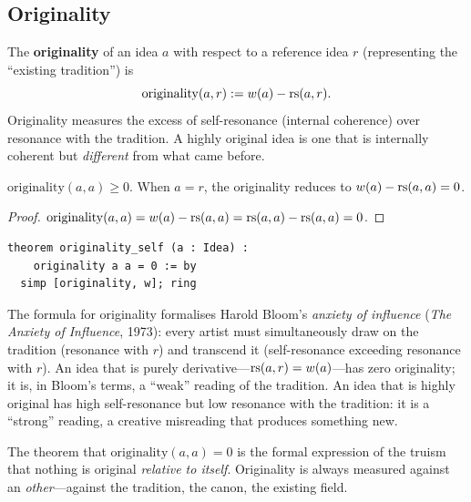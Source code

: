 \subsection{Originality}

\begin{definition}[Originality]
\label{def:originality}
The \textbf{originality} of an idea $a$ with respect to a reference idea
$r$ (representing the ``existing tradition'') is
\[
  \mathrm{originality}(a, r) := w(a) - \mathrm{rs}(a, r).
\]
Originality measures the excess of self-resonance (internal coherence) over
resonance with the tradition.  A highly original idea is one that is
internally coherent but \emph{different} from what came before.
\end{definition}

\begin{theorem}
\label{thm:originality-nonneg-self}
$\mathrm{originality}(a, a) \geq 0$.  When $a = r$, the originality
reduces to $w(a) - \mathrm{rs}(a, a) = 0$.
\end{theorem}

\begin{proof}
$\mathrm{originality}(a, a) = w(a) - \mathrm{rs}(a, a) = \mathrm{rs}(a, a) - \mathrm{rs}(a, a) = 0$.
\end{proof}

\begin{lstlisting}
theorem originality_self (a : Idea) :
    originality a a = 0 := by
  simp [originality, w]; ring
\end{lstlisting}

\begin{interpretation}
\label{int:originality-bloom}
The formula for originality formalises Harold Bloom's \emph{anxiety of
influence} (\emph{The Anxiety of Influence}, 1973): every artist must
simultaneously draw on the tradition (resonance with $r$) and transcend
it (self-resonance exceeding resonance with $r$).  An idea that is purely
derivative---$\mathrm{rs}(a, r) = w(a)$---has zero originality; it is, in Bloom's
terms, a ``weak'' reading of the tradition.  An idea that is highly original
has high self-resonance but low resonance with the tradition: it is a
``strong'' reading, a creative misreading that produces something new.

The theorem that $\mathrm{originality}(a, a) = 0$ is the formal expression
of the truism that nothing is original \emph{relative to itself}.
Originality is always measured against an \emph{other}---against the
tradition, the canon, the existing field.
\end{interpretation}

